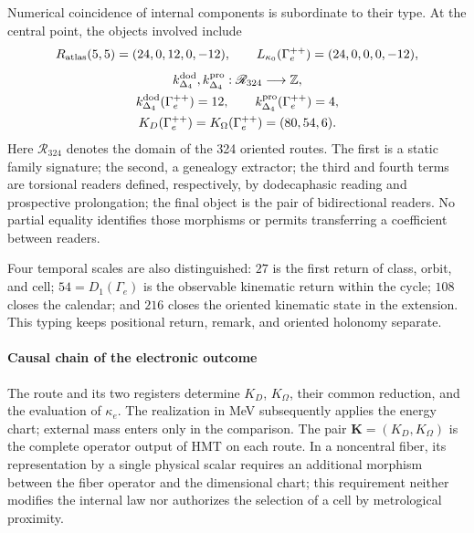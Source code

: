 Numerical coincidence of internal components is subordinate to their
type. At the central point, the objects involved include
\[
 R_{\rm atlas}(5,5)=(24,0,12,0,-12),
 \qquad
 L_{\kappa_0}(\Gamma_e^{++})=(24,0,0,0,-12),
\]
\[
 \begin{gathered}
 k_{\Delta_4}^{\rm dod},k_{\Delta_4}^{\rm pro}:
 \mathscr R_{324}\longrightarrow\mathbb Z,\\
 k_{\Delta_4}^{\rm dod}(\Gamma_e^{++})=12,
 \qquad
 k_{\Delta_4}^{\rm pro}(\Gamma_e^{++})=4,\\
 K_D(\Gamma_e^{++})=K_\Omega(\Gamma_e^{++})=(80,54,6).
 \end{gathered}
\]
Here \(\mathscr R_{324}\) denotes the domain of the 324 oriented routes.
The first is a static family signature; the second, a genealogy
extractor; the third and fourth terms are torsional readers defined,
respectively, by dodecaphasic reading and prospective prolongation;
the final object is the pair of bidirectional readers. No partial equality
identifies those morphisms or permits transferring a coefficient between
readers.

Four temporal scales are also distinguished: \(27\) is the first return of class, orbit, and cell; \(54=D_1(\Gamma_e)\) is the observable kinematic return within the cycle; \(108\) closes the calendar; and \(216\) closes the oriented kinematic state in the extension. This typing keeps positional return, remark, and oriented holonomy separate.

\paragraph{Causal chain of the electronic outcome}
The route and its two registers determine \(K_D\), \(K_\Omega\), their common
reduction, and the evaluation of \(\kappa_e\). The realization in MeV subsequently applies
the energy chart; external mass enters only in the comparison. The pair
\(\mathbf K=(K_D,K_\Omega)\) is the complete operator output of HMT on
each route. In a noncentral fiber, its representation by a single physical
scalar requires an additional morphism between the fiber operator and the
dimensional chart; this requirement neither modifies the internal law nor authorizes
the selection of a cell by metrological proximity.
